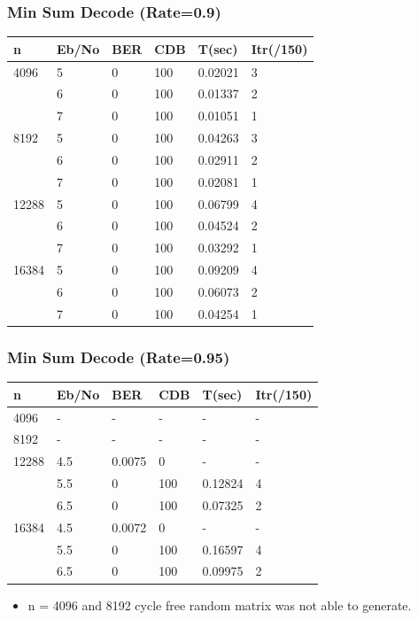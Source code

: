\documentclass[xcolor=dvipsname]
{beamer}
\begin{document}
\begin{frame}[t] 
\frametitle{Min Sum Decode (Rate=0.9)}

\begin{table}[]
\centering
\begin{tabular}{|l|l|l|l|l|l|}
\hline
n     & Eb/No & BER & CDB & T(sec)  & Itr(/150) \\ \hline
4096  & 5     & 0   & 100 & 0.02021 & 3         \\ 
      & 6     & 0   & 100 & 0.01337 & 2         \\ 
      & 7     & 0   & 100 & 0.01051 & 1         \\ \hline
8192  & 5     & 0   & 100 & 0.04263 & 3         \\ 
      & 6     & 0   & 100 & 0.02911 & 2         \\ 
      & 7     & 0   & 100 & 0.02081 & 1         \\ \hline
12288 & 5     & 0   & 100 & 0.06799 & 4         \\ 
      & 6     & 0   & 100 & 0.04524 & 2         \\ 
      & 7     & 0   & 100 & 0.03292 & 1         \\ \hline
16384 & 5     & 0   & 100 & 0.09209 & 4         \\ 
      & 6     & 0   & 100 & 0.06073 & 2         \\ 
      & 7     & 0   & 100 & 0.04254 & 1         \\ \hline
\end{tabular}
\end{table}

\end{frame}


\begin{frame}[t] 
\frametitle{Min Sum Decode (Rate=0.95)}

\begin{table}[]
\centering
\begin{tabular}{|l|l|l|l|l|l|}
\hline
n     & Eb/No & BER    & CDB & T(sec)  & Itr(/150) \\ \hline
4096  & -     & -      & -   & -       & -         \\ \hline
8192  & -     & -      & -   & -       & -         \\ \hline
12288 & 4.5   & 0.0075 & 0   & -       & -         \\ 
      & 5.5   & 0      & 100 & 0.12824 & 4         \\ 
      & 6.5   & 0      & 100 & 0.07325 & 2         \\ \hline
16384 & 4.5   & 0.0072 & 0   & -       & -         \\ 
      & 5.5   & 0      & 100 & 0.16597 & 4         \\ 
      & 6.5   & 0      & 100 & 0.09975 & 2         \\ \hline
\end{tabular}
\end{table}
\begin{itemize}
\item n = 4096 and 8192 cycle free random matrix was not able to generate. 
\end{itemize}
\end{frame}
\end{document}
